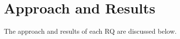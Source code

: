 \clearpage





\section{Approach and Results}
\label{sec:approach-results}
The approach and results of each RQ are discussed below.







